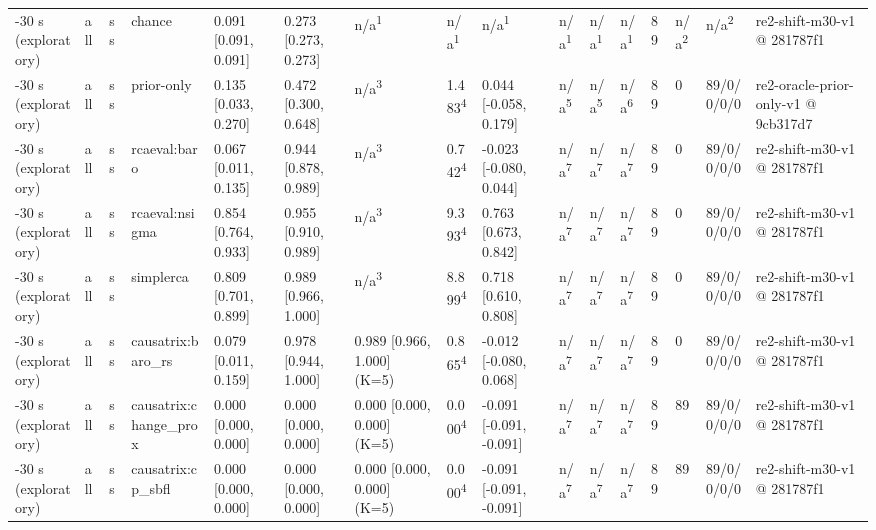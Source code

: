 \begin{table}[t]
\begin{tabular}{llllllllllllllll}
-30 s (exploratory) & all & ss & chance & 0.091 [0.091, 0.091] & 0.273 [0.273, 0.273] & n/a\textsuperscript{1} & n/a\textsuperscript{1} & n/a\textsuperscript{1} & n/a\textsuperscript{1} & n/a\textsuperscript{1} & n/a\textsuperscript{1} & 89 & n/a\textsuperscript{2} & n/a\textsuperscript{2} & re2-shift-m30-v1 @ 281787f1 \\
-30 s (exploratory) & all & ss & prior-only & 0.135 [0.033, 0.270] & 0.472 [0.300, 0.648] & n/a\textsuperscript{3} & 1.483\textsuperscript{4} & 0.044 [-0.058, 0.179] & n/a\textsuperscript{5} & n/a\textsuperscript{5} & n/a\textsuperscript{6} & 89 & 0 & 89/0/0/0/0 & re2-oracle-prior-only-v1 @ 9cb317d7 \\
-30 s (exploratory) & all & ss & rcaeval:baro & 0.067 [0.011, 0.135] & 0.944 [0.878, 0.989] & n/a\textsuperscript{3} & 0.742\textsuperscript{4} & -0.023 [-0.080, 0.044] & n/a\textsuperscript{7} & n/a\textsuperscript{7} & n/a\textsuperscript{7} & 89 & 0 & 89/0/0/0/0 & re2-shift-m30-v1 @ 281787f1 \\
-30 s (exploratory) & all & ss & rcaeval:nsigma & 0.854 [0.764, 0.933] & 0.955 [0.910, 0.989] & n/a\textsuperscript{3} & 9.393\textsuperscript{4} & 0.763 [0.673, 0.842] & n/a\textsuperscript{7} & n/a\textsuperscript{7} & n/a\textsuperscript{7} & 89 & 0 & 89/0/0/0/0 & re2-shift-m30-v1 @ 281787f1 \\
-30 s (exploratory) & all & ss & simplerca & 0.809 [0.701, 0.899] & 0.989 [0.966, 1.000] & n/a\textsuperscript{3} & 8.899\textsuperscript{4} & 0.718 [0.610, 0.808] & n/a\textsuperscript{7} & n/a\textsuperscript{7} & n/a\textsuperscript{7} & 89 & 0 & 89/0/0/0/0 & re2-shift-m30-v1 @ 281787f1 \\
-30 s (exploratory) & all & ss & causatrix:baro\_rs & 0.079 [0.011, 0.159] & 0.978 [0.944, 1.000] & 0.989 [0.966, 1.000] (K=5) & 0.865\textsuperscript{4} & -0.012 [-0.080, 0.068] & n/a\textsuperscript{7} & n/a\textsuperscript{7} & n/a\textsuperscript{7} & 89 & 0 & 89/0/0/0/0 & re2-shift-m30-v1 @ 281787f1 \\
-30 s (exploratory) & all & ss & causatrix:change\_prox & 0.000 [0.000, 0.000] & 0.000 [0.000, 0.000] & 0.000 [0.000, 0.000] (K=5) & 0.000\textsuperscript{4} & -0.091 [-0.091, -0.091] & n/a\textsuperscript{7} & n/a\textsuperscript{7} & n/a\textsuperscript{7} & 89 & 89 & 89/0/0/0/0 & re2-shift-m30-v1 @ 281787f1 \\
-30 s (exploratory) & all & ss & causatrix:cp\_sbfl & 0.000 [0.000, 0.000] & 0.000 [0.000, 0.000] & 0.000 [0.000, 0.000] (K=5) & 0.000\textsuperscript{4} & -0.091 [-0.091, -0.091] & n/a\textsuperscript{7} & n/a\textsuperscript{7} & n/a\textsuperscript{7} & 89 & 89 & 89/0/0/0/0 & re2-shift-m30-v1 @ 281787f1 \\

\end{tabular}
\end{table}
